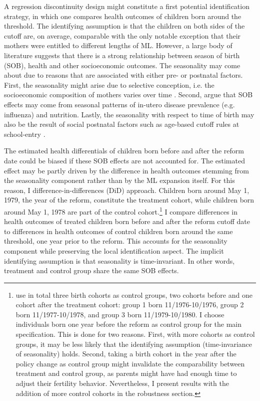 A regression discontinuity design might constitute a first potential identification strategy, in which one compares health outcomes of children born around the threshold. The identifying assumption is that the children on both sides of the cutoff are, on average, comparable with the only notable exception that their mothers were entitled to different lengths of ML. However, a large body of literature suggests that there is a strong relationship between season of birth (SOB), health and other socioeconomic outcomes. The seasonality may come about due to reasons that are associated with either pre- or postnatal factors. First, the seasonality might arise due to selective conception, i.e. the socioeconomic composition of mothers varies over time \citep{buckles2013season}. Second, \cite{currie2013within} argue that SOB effects may come from seasonal patterns of in-utero disease prevalence (e.g. influenza) and nutrition. Lastly, the seasonality with respect to time of birth may also be the result of social postnatal factors such as age-based cutoff rules at school-entry \citep{black2011too}.


The estimated health differentials of children born before and after the reform date could be biased if these SOB effects are not accounted for. The estimated effect may be partly driven by the difference in health outcomes stemming from the seasonality component rather than by the ML expansion itself. For this reason, I  difference-in-differences (DiD) approach. Children born around May 1, 1979, the year of the reform, constitute the treatment cohort, while children born around May 1, 1978 are part of the control cohort.\footnote{\cite{Dustmann2012} use in total three birth cohorts as control groups, two cohorts before and one cohort after the treatment cohort: group 1 born 11/1976-10/1976, group 2 born 11/1977-10/1978, and group 3 born 11/1979-10/1980. I choose individuals born one year before the reform as control group for the main specification. This is done for two reasons. First, with more cohorts as control groups, it may be less likely that the identifying assumption (time-invariance of seasonality) holds. Second, taking a birth cohort in the year after the policy change as control group might invalidate the comparability between treatment and control group, as parents might have had enough time to adjust their fertility behavior. Nevertheless, I present results with the addition of more control cohorts in the robustness section.} I compare differences in health outcomes of treated children born before and after the reform cutoff date to differences in health outcomes of control children born around the same threshold, one year prior to the reform. This accounts for the seasonality component while preserving the local identification aspect. The implicit identifying assumption is that seasonality is time-invariant. In other words, treatment and control group share the same SOB effects.\label{rev_mlch: r1_rdd+did_em_section}


